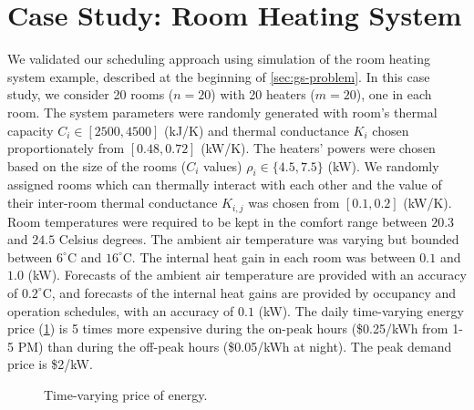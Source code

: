 \section{\protect{\hspace{-8pt}}Case Study: Room Heating System}
\label{sec:simulation}

We validated our scheduling approach using simulation of the room heating system example, described at the beginning of \cref{sec:gs-problem}.
In this case study, we consider 20 rooms ($n=20$) with 20 heaters ($m=20$), one in each room.
The system parameters were randomly generated with room's thermal capacity $C_i \in [2500, 4500]$ (kJ/K) and thermal conductance $K_i$ chosen proportionately from $[0.48,0.72]$ (kW/K).
The heaters' powers were chosen based on the size of the rooms ($C_{i}$ values) $\rho_i \in \{4.5, 7.5\}$ (kW).
We randomly assigned rooms which can thermally interact with each other and the value of their inter-room thermal conductance $K_{i,j}$ was chosen from $[0.1,0.2]$ (kW/K). %
Room temperatures were required to be kept in the comfort range between $20.3$ and $24.5$ Celsius degrees.
The ambient air temperature was varying but bounded between $6^{\circ}\mathrm{C}$ and $16^{\circ}\mathrm{C}$. 
The %
internal heat gain in each room was between $0.1$ and $1.0$ (kW).
Forecasts of the ambient air temperature are provided %
with an accuracy of $0.2^{\circ}\mathrm{C}$, and forecasts of the internal heat gains are provided by occupancy and operation schedules, with an accuracy of $0.1$ (kW).
The daily time-varying energy price (\cref{fig:simulation:price}) is 5 times more expensive during the on-peak hours (\$0.25/kWh from 1-5 PM) than during the off-peak hours (\$0.05/kWh at night).
The peak demand price is \$2/kW.

\begin{figure}[tb]
  \centering
  
  \vspace{-12pt}
  \caption{Time-varying price of energy.} %
  \vspace{-6pt}
  \label{fig:simulation:price}
\end{figure}



